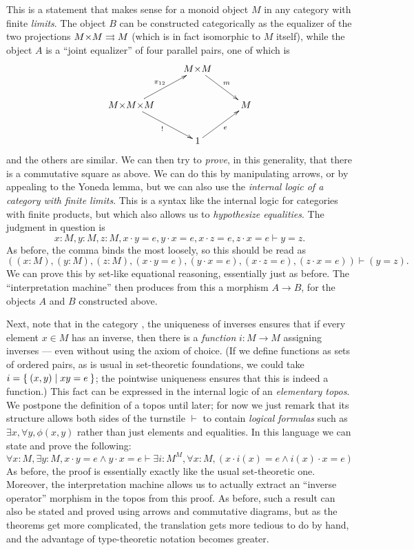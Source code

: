 \documentclass{book}
\let\types\vdash
\begin{document}
This is a statement that makes sense for a monoid object $M$ in any category with finite \emph{limits}.
The object $B$ can be constructed categorically as the equalizer of the two projections $M\times M \toto M$ (which is in fact isomorphic to $M$ itself), while the object $A$ is a ``joint equalizer'' of four parallel pairs, one of which is
\[ \vcenter{\xymatrix{ & M \times M \ar[dr]^m \\
    M\times M\times M \ar[ur]^{\pi_{12}} \ar[dr]_{!} && M \\
    & 1 \ar[ur]_e }} \]
and the others are similar.
We can then try to \emph{prove}, in this generality, that there is a commutative square as above.
We can do this by manipulating arrows, or by appealing to the Yoneda lemma, but we can also use the \emph{internal logic of a category with finite limits}.
This is a syntax like the internal logic for categories with finite products, but which also allows us to \emph{hypothesize equalities}.
The judgment in question is
\begin{equation}\label{eq:pointwise-unique-inverses}
  x:M, y:M, z:M, x\cdot y = e, y\cdot x=e, x\cdot z = e, z\cdot x = e \types y=z.
\end{equation}
As before, the comma binds the most loosely, so this should be read as
\[ ((x:M), (y:M), (z:M), (x\cdot y = e), (y\cdot x=e), (x\cdot z = e), (z\cdot x = e)) \types (y=z). \]
We can prove this by set-like equational reasoning, essentially just as before.
The ``interpretation machine'' then produces from this a morphism $A\to B$, for the objects $A$ and $B$ constructed above.

Next, note that in the category \bSet, the uniqueness of inverses ensures that if every element $x\in M$ has an inverse, then there is a \emph{function} $i:M\to M$ assigning inverses --- even without using the axiom of choice.
(If we define functions as sets of ordered pairs, as is usual in set-theoretic foundations, we could take $i = \Set{(x,y) | xy=e}$; the pointwise uniqueness ensures that this is indeed a function.)
This fact can be expressed in the internal logic of an \emph{elementary topos}.
We postpone the definition of a topos until later; for now we just remark that its structure allows both sides of the turnstile $\types$ to contain \emph{logical formulas} such as $\exists x, \forall y, \phi(x,y)$ rather than just elements and equalities.
In this language we can state and prove the following:
\[ \forall x:M, \exists y:M, x\cdot y = e \land y\cdot x = e \types
\exists i:M^M, \forall x:M, (x\cdot i(x) = e \land i(x)\cdot x = e)
\]
As before, the proof is essentially exactly like the usual set-theoretic one.
Moreover, the interpretation machine allows us to actually extract an ``inverse operator'' morphism in the topos from this proof.
As before, such a result can also be stated and proved using arrows and commutative diagrams, but as the theorems get more complicated, the translation gets more tedious to do by hand, and the advantage of type-theoretic notation becomes greater.
\end{document}
